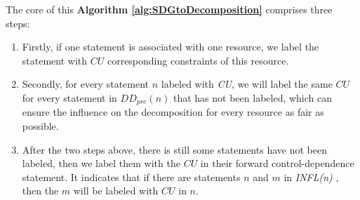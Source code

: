 The core of this \textbf{Algorithm \ref{alg:SDGtoDecomposition}} comprises three steps:
\begin{enumerate}
\item Firstly, if one statement is associated with one resource, we label the statement with $CU$ corresponding constraints of this resource.
\item Secondly, for every statement $n$ labeled with \emph{CU}, we will label the same $CU$ for every statement in $DD_{pre}(n)$ that has not been labeled, which can ensure the influence on the decomposition for every resource as fair as possible.
\item After the two steps above, there is still some statements have not been labeled, then we label them with the $CU$ in their forward control-dependence statement. It indicates that if there are statements $n$ and $m$ in \emph{INFL(n)} , then the $m$ will be labeled with $CU$ in $n$.
\end{enumerate}


